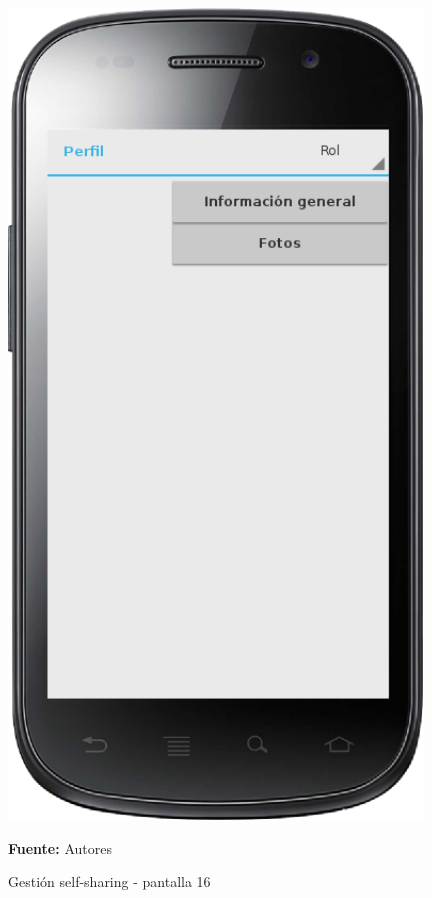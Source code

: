 \begin{figure}[!htb]
  \begin{center}
    \includegraphics[width=11cm]{./imagenes/UI/Self_sharing/self_sharing_16.png}
    \caption{Gestión self-sharing - pantalla 16}
    \label{fig:self_sharing_16}
    \textbf{Fuente:}  Autores
  \end{center}
\end{figure}

